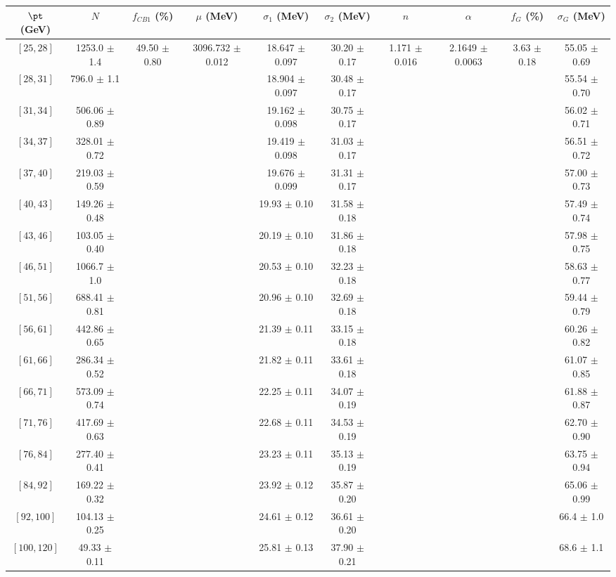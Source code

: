 \begin{tabular}{c||c|c|c|c|c|c|c|c|c}
$\pt$ (GeV) & $N$ & $f_{CB1}$ (\%)  & $\mu$ (MeV) & $\sigma_1$ (MeV) & $\sigma_2$ (MeV) & $n$ & $\alpha$ & $f_G$ (\%) & $\sigma_G$ (MeV) \\
\hline
$[25, 28]$ & 1253.0 $\pm$ 1.4 & \multirow{17}{*}{49.50 $\pm$ 0.80} & \multirow{17}{*}{3096.732 $\pm$ 0.012} & 18.647 $\pm$ 0.097 & 30.20 $\pm$ 0.17 & \multirow{17}{*}{1.171 $\pm$ 0.016} & \multirow{17}{*}{2.1649 $\pm$ 0.0063} & \multirow{17}{*}{3.63 $\pm$ 0.18} & 55.05 $\pm$ 0.69\\
$[28, 31]$ & 796.0 $\pm$ 1.1 &  &  & 18.904 $\pm$ 0.097 & 30.48 $\pm$ 0.17 &  &  &  & 55.54 $\pm$ 0.70\\
$[31, 34]$ & 506.06 $\pm$ 0.89 &  &  & 19.162 $\pm$ 0.098 & 30.75 $\pm$ 0.17 &  &  &  & 56.02 $\pm$ 0.71\\
$[34, 37]$ & 328.01 $\pm$ 0.72 &  &  & 19.419 $\pm$ 0.098 & 31.03 $\pm$ 0.17 &  &  &  & 56.51 $\pm$ 0.72\\
$[37, 40]$ & 219.03 $\pm$ 0.59 &  &  & 19.676 $\pm$ 0.099 & 31.31 $\pm$ 0.17 &  &  &  & 57.00 $\pm$ 0.73\\
$[40, 43]$ & 149.26 $\pm$ 0.48 &  &  & 19.93 $\pm$ 0.10 & 31.58 $\pm$ 0.18 &  &  &  & 57.49 $\pm$ 0.74\\
$[43, 46]$ & 103.05 $\pm$ 0.40 &  &  & 20.19 $\pm$ 0.10 & 31.86 $\pm$ 0.18 &  &  &  & 57.98 $\pm$ 0.75\\
$[46, 51]$ & 1066.7 $\pm$ 1.0 &  &  & 20.53 $\pm$ 0.10 & 32.23 $\pm$ 0.18 &  &  &  & 58.63 $\pm$ 0.77\\
$[51, 56]$ & 688.41 $\pm$ 0.81 &  &  & 20.96 $\pm$ 0.10 & 32.69 $\pm$ 0.18 &  &  &  & 59.44 $\pm$ 0.79\\
$[56, 61]$ & 442.86 $\pm$ 0.65 &  &  & 21.39 $\pm$ 0.11 & 33.15 $\pm$ 0.18 &  &  &  & 60.26 $\pm$ 0.82\\
$[61, 66]$ & 286.34 $\pm$ 0.52 &  &  & 21.82 $\pm$ 0.11 & 33.61 $\pm$ 0.18 &  &  &  & 61.07 $\pm$ 0.85\\
$[66, 71]$ & 573.09 $\pm$ 0.74 &  &  & 22.25 $\pm$ 0.11 & 34.07 $\pm$ 0.19 &  &  &  & 61.88 $\pm$ 0.87\\
$[71, 76]$ & 417.69 $\pm$ 0.63 &  &  & 22.68 $\pm$ 0.11 & 34.53 $\pm$ 0.19 &  &  &  & 62.70 $\pm$ 0.90\\
$[76, 84]$ & 277.40 $\pm$ 0.41 &  &  & 23.23 $\pm$ 0.11 & 35.13 $\pm$ 0.19 &  &  &  & 63.75 $\pm$ 0.94\\
$[84, 92]$ & 169.22 $\pm$ 0.32 &  &  & 23.92 $\pm$ 0.12 & 35.87 $\pm$ 0.20 &  &  &  & 65.06 $\pm$ 0.99\\
$[92, 100]$ & 104.13 $\pm$ 0.25 &  &  & 24.61 $\pm$ 0.12 & 36.61 $\pm$ 0.20 &  &  &  & 66.4 $\pm$ 1.0\\
$[100, 120]$ & 49.33 $\pm$ 0.11 &  &  & 25.81 $\pm$ 0.13 & 37.90 $\pm$ 0.21 &  &  &  & 68.6 $\pm$ 1.1\\
\end{tabular}
